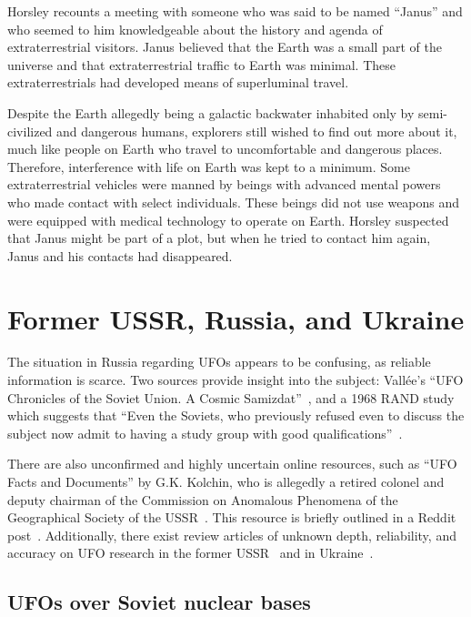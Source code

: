 Horsley recounts a meeting with someone who was said to be named ``Janus'' and who seemed to him knowledgeable about the history and agenda of extraterrestrial visitors.
Janus believed that the Earth was a small part of the universe and that extraterrestrial traffic to Earth was minimal.
These extraterrestrials had developed means of superluminal travel.

Despite the Earth allegedly being a galactic backwater inhabited only by semi-civilized and dangerous humans,
explorers still wished to find out more about it, much like people on Earth who travel to uncomfortable and dangerous places.
Therefore, interference with life on Earth was kept to a minimum.
Some extraterrestrial vehicles were manned by beings with advanced mental powers who made contact with select individuals.
These beings did not use weapons and were equipped with medical technology to operate on Earth.
Horsley suspected that Janus might be part of a plot, but when he tried to contact him again, Janus and his contacts had disappeared.


\section{Former USSR, Russia, and Ukraine}
\label{2023-UFO-part-Perception-types-Russia}

The situation in Russia regarding UFOs appears to be confusing, as reliable information is scarce.
Two sources provide insight into the subject: Vall\'ee's
``UFO Chronicles of the Soviet Union. A Cosmic Samizdat''~\cite{Vallee1992Feb}, and a 1968 RAND study which suggests that
``Even the Soviets, who previously refused even to discuss the subject now admit to having a study group with good qualifications''~\cite[p.~6]{Kocher-RAND-1968Jan}.

There are also unconfirmed and highly uncertain online resources, such as ``UFO Facts and Documents'' by G.K. Kolchin,
who is allegedly a retired colonel and deputy chairman of the Commission on Anomalous Phenomena of the Geographical
 Society of the USSR~\cite{Kolchin2018Feb}. This resource is briefly outlined in a Reddit post~\cite{TypewriterTourist2023Jan}.
 Additionally, there exist review articles of unknown depth, reliability, and accuracy on UFO research in the former USSR~\cite{Alexeyev97,PlatovSokolov-2000} and in Ukraine~\cite{Gershtein2015,Bilyk2016Sep}.


\subsection{UFOs over Soviet nuclear bases}

